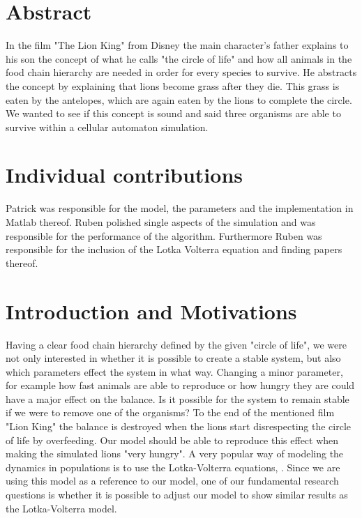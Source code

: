 \documentclass[11pt]{article}
\begin{document}

\tableofcontents

\newpage




\section{Abstract}
In the film "The Lion King" from Disney the main character's father explains to his son the concept of what he calls "the circle of life" and how all animals in the food chain hierarchy are needed in order for every species to survive. He abstracts the concept by explaining that lions become grass after they die. This grass is eaten by the antelopes, which are again eaten by the lions to complete the circle. We wanted to see if this concept is sound and said three organisms are able to survive within a cellular automaton simulation.

\section{Individual contributions}
Patrick was responsible for the model, the parameters and the implementation in Matlab thereof. Ruben polished single aspects of the simulation and was responsible for the performance of the algorithm. Furthermore Ruben was responsible for the inclusion of the Lotka Volterra equation and finding papers thereof.

\section{Introduction and Motivations}
Having a clear food chain hierarchy defined by the given "circle of life", we were not only interested in whether it is possible to create a stable system, but also which parameters effect the system in what way. Changing a minor parameter, for example how fast animals are able to reproduce or how hungry they are could have a major effect on the balance. Is it possible for the system to remain stable if we were to remove one of the organisms? To the end of the mentioned film "Lion King" the balance is destroyed when the lions start disrespecting the circle of life by overfeeding. Our model should be able to reproduce this effect when making the simulated lions "very hungry".
A very popular way of modeling the dynamics in populations is to use the Lotka-Volterra equations, \cite{lotkaVolterra}. Since we are using this model as a reference to our model, one of our fundamental research questions is whether it is possible to adjust our model to show similar results as the Lotka-Volterra model.
\end{document}
